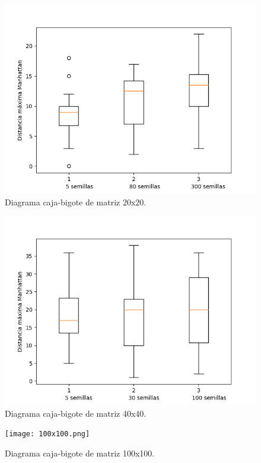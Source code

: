 \documentclass[a4paper, 11pt]{article}
\begin{document}
\begin{figure}[H]
  \centering      
  \includegraphics[scale=.7]{20x20.png}
  \caption{Diagrama caja-bigote de matriz 20x20.}
  \label{f1}
\end{figure}
\bigskip

\begin{figure}[H]
  \centering      
  \includegraphics[scale=.7]{40x40.png}
  \caption{Diagrama caja-bigote de matriz 40x40.}
  \label{f2}
\end{figure}
\bigskip

\begin{figure}[H]
  \centering       
  \texttt{[image: 100x100.png]}
  \caption{Diagrama caja-bigote de matriz 100x100.}
  \label{f3}
\end{figure}
\bigskip
\end{document}
